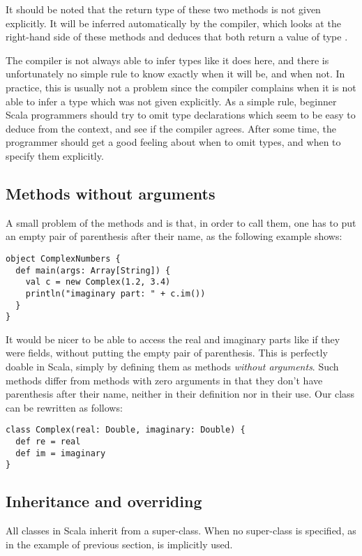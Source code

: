 \documentclass[a4paper,12pt,twoside,titlepage]{article}
\newcommand{\langname}[1]{#1\xspace}
\newcommand{\Scala}{\langname{Scala}}
\begin{document}
It should be noted that the return type of these two methods is not
given explicitly. It will be inferred automatically by the compiler,
which looks at the right-hand side of these methods and deduces that
both return a value of type .

The compiler is not always able to infer types like it does here, and
there is unfortunately no simple rule to know exactly when it will be,
and when not. In practice, this is usually not a problem since the
compiler complains when it is not able to infer a type which was not
given explicitly. As a simple rule, beginner \Scala programmers should
try to omit type declarations which seem to be easy to deduce from the
context, and see if the compiler agrees. After some time, the
programmer should get a good feeling about when to omit types, and
when to specify them explicitly.

\subsection{Methods without arguments}
\label{sec:meth-wo-args}

A small problem of the methods  and  is that, in
order to call them, one has to put an empty pair of parenthesis after
their name, as the following example shows:
\begin{lstlisting}[escapechar=\#]
object ComplexNumbers {
  def main(args: Array[String]) {
    val c = new Complex(1.2, 3.4)
    println("imaginary part: " + c.im())
  }
}
\end{lstlisting}
It would be nicer to be able to access the real and imaginary parts
like if they were fields, without putting the empty pair of
parenthesis. This is perfectly doable in \Scala, simply by defining
them as methods \emph{without arguments}. Such methods differ from
methods with zero arguments in that they don't have parenthesis after
their name, neither in their definition nor in their use. Our
 class can be rewritten as follows:
\begin{lstlisting}
class Complex(real: Double, imaginary: Double) {
  def re = real
  def im = imaginary
}
\end{lstlisting}

\subsection{Inheritance and overriding}
\label{sec:inheritance}

All classes in \Scala inherit from a super-class. When no super-class
is specified, as in the  example of previous section,
 is implicitly used.
\end{document}
